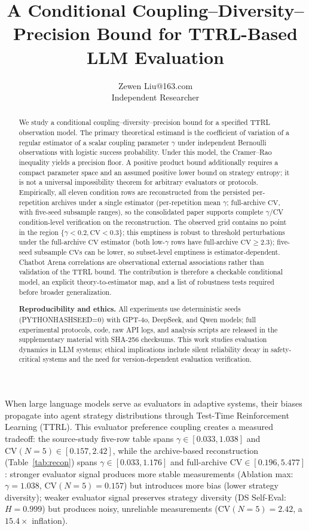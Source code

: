 \documentclass[11pt]{article}
\author{\name Zewen Liu\email 17353895263@163.com\\\addr Independent Researcher}
\title{A Conditional Coupling--Diversity--Precision Bound for TTRL-Based LLM Evaluation}
\begin{document}
\maketitle
\begin{abstract}
We study a conditional coupling--diversity--precision bound for a specified TTRL observation model. The primary theoretical estimand is the coefficient of variation of a regular estimator of a scalar coupling parameter $\gamma$ under independent Bernoulli observations with logistic success probability. Under this model, the Cramer--Rao inequality yields a precision floor. A positive product bound additionally requires a compact parameter space and an assumed positive lower bound on strategy entropy; it is not a universal impossibility theorem for arbitrary evaluators or protocols. Empirically, all eleven condition rows are reconstructed from the persisted per-repetition archives under a single estimator (per-repetition mean $\gamma$; full-archive $\mathrm{CV}$, with five-seed subsample ranges), so the consolidated paper supports complete $\gamma$/CV condition-level verification on the reconstruction. The observed grid contains no point in the region $\{\gamma<0.2,\mathrm{CV}<0.3\}$; this emptiness is robust to threshold perturbations under the full-archive $\mathrm{CV}$ estimator (both low-$\gamma$ rows have full-archive $\mathrm{CV} \geq 2.3$); five-seed subsample $\mathrm{CV}$s can be lower, so subset-level emptiness is estimator-dependent. Chatbot Arena correlations are observational external associations rather than validation of the TTRL bound. The contribution is therefore a checkable conditional model, an explicit theory-to-estimator map, and a list of robustness tests required before broader generalization.


\textbf{Reproducibility and ethics.} All experiments use deterministic seeds (PYTHONHASHSEED=0) with GPT-4o, DeepSeek, and Qwen models; full experimental protocols, code, raw API logs, and analysis scripts are released in the supplementary material with SHA-256 checksums. This work studies evaluation dynamics in LLM systems; ethical implications include silent reliability decay in safety-critical systems and the need for version-dependent evaluation verification.\end{abstract}




When large language models serve as evaluators in adaptive systems, their biases propagate into agent strategy distributions through Test-Time Reinforcement Learning (TTRL). This evaluator preference coupling creates a measured tradeoff: the source-study five-row table spans $\gamma \in [0.033, 1.038]$ and $\mathrm{CV}(N{=}5) \in [0.157, 2.42]$, while the archive-based reconstruction (Table~\ref{tab:recon}) spans $\gamma \in [0.033, 1.176]$ and full-archive $\mathrm{CV} \in [0.196, 5.477]$: stronger evaluator signal produces more stable measurements (Ablation max: $\gamma = 1.038$, $\mathrm{CV}(N{=}5) = 0.157$) but introduces more bias (lower strategy diversity); weaker evaluator signal preserves strategy diversity (DS Self-Eval: $H = 0.999$) but produces noisy, unreliable measurements ($\mathrm{CV}(N{=}5) = 2.42$, a $15.4\times$ inflation).
\end{document}
